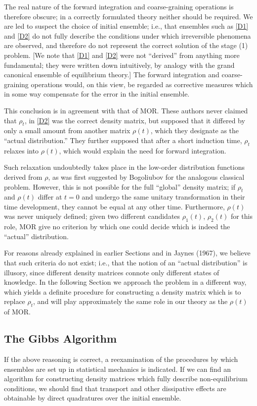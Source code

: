 The real nature of the forward integration and coarse-graining operations is therefore obscure; in a correctly formulated theory neither should be required.
We are led to suspect the choice of initial ensemble; i.e., that ensembles such as \eqref{D1} and \eqref{D2} do not fully describe the conditions under which irreversible phenomena are observed, and therefore do not represent the correct solution of the stage (1) problem.
[We note that \eqref{D1} and \eqref{D2} were not ``derived'' from anything more fundamental; they were written down intuitively, by analogy with the grand canonical ensemble of equilibrium theory.]
The forward integration and coarse-graining operations would, on this view, be regarded as corrective measures which in some way compensate for the error in the initial ensemble.

This conclusion is in agreement with that of MOR.
These authors never claimed that $\rho_t$, in \eqref{D2} was the correct density matrix, but supposed that it differed by only a small amount from another matrix $\rho(t)$, which they designate as the ``actual distribution.''
They further supposed that after a short induction time, $\rho_t$ relaxes into $\rho(t)$, which would explain the need for forward integration.

Such relaxation undoubtedly takes place in the low-order distribution functions derived from $\rho$, as was first suggested by Bogoliubov for the analogous classical problem.
However, this is not possible for the full ``global'' density matrix; if $\rho_t$ and $\rho(t)$ differ at $t = 0$ and undergo the same unitary transformation in their time development, they cannot be equal at any other time.
Furthermore, $\rho(t)$ was never uniquely defined; given two different candidates $\rho_1(t)$, $\rho_2(t)$ for this role, MOR give no criterion by which one could decide which is indeed the ``actual'' distribution.

For reasons already explained in earlier Sections and in \cite{jaynes67}{Jaynes (1967)}, we believe that such criteria do not exist; i.e., that the notion of an ``actual distribution'' is illusory, since different density matrices connote only different states of knowledge.
In the following Section we approach the problem in a different way, which yields a definite procedure for constructing a density matrix which is to replace $\rho_t$, and will play approximately the same role in our theory as the $\rho(t)$ of MOR.


\subsection{The Gibbs Algorithm}
If the above reasoning is correct, a reexamination of the procedures by which ensembles are set up in statistical mechanics is indicated.
If we can find an algorithm for constructing density matrices which fully describe non-equilibrium conditions, we should find that transport and other dissipative effects are obtainable by direct quadratures over the initial ensemble.

